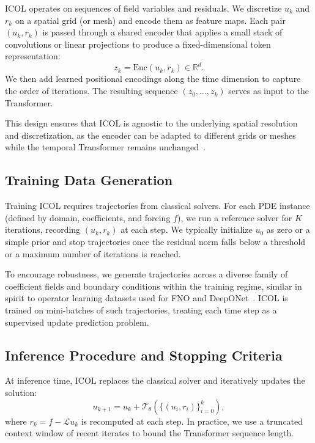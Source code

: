 \documentclass{article}
\begin{document}
ICOL operates on sequences of field variables and residuals. We discretize $u_k$ and $r_k$ on a spatial grid (or mesh) and encode them as feature maps. Each pair $(u_k, r_k)$ is passed through a shared encoder that applies a small stack of convolutions or linear projections to produce a fixed-dimensional token representation:
\begin{equation}
z_k = \mathrm{Enc}(u_k, r_k) \in \mathbb{R}^d.
\end{equation}
We then add learned positional encodings along the time dimension to capture the order of iterations. The resulting sequence $(z_0,\ldots,z_k)$ serves as input to the Transformer.

This design ensures that ICOL is agnostic to the underlying spatial resolution and discretization, as the encoder can be adapted to different grids or meshes while the temporal Transformer remains unchanged~\cite{bhattacharya2021meshgraphnet,pfau2020neuralfields}.

\subsection{Training Data Generation}

Training ICOL requires trajectories from classical solvers. For each PDE instance (defined by domain, coefficients, and forcing $f$), we run a reference solver for $K$ iterations, recording $(u_k, r_k)$ at each step. We typically initialize $u_0$ as zero or a simple prior and stop trajectories once the residual norm falls below a threshold or a maximum number of iterations is reached.

To encourage robustness, we generate trajectories across a diverse family of coefficient fields and boundary conditions within the training regime, similar in spirit to operator learning datasets used for FNO and DeepONet~\cite{li2020fourier,lu2021deeponet,brandstetter2022message}. ICOL is trained on mini-batches of such trajectories, treating each time step as a supervised update prediction problem.

\subsection{Inference Procedure and Stopping Criteria}

At inference time, ICOL replaces the classical solver and iteratively updates the solution:
\begin{equation}
u_{k+1} = u_k + \mathcal{T}_\theta(\{(u_i, r_i)\}_{i=0}^k),
\end{equation}
where $r_k = f - \mathcal{L}u_k$ is recomputed at each step. In practice, we use a truncated context window of recent iterates to bound the Transformer sequence length.
\end{document}
